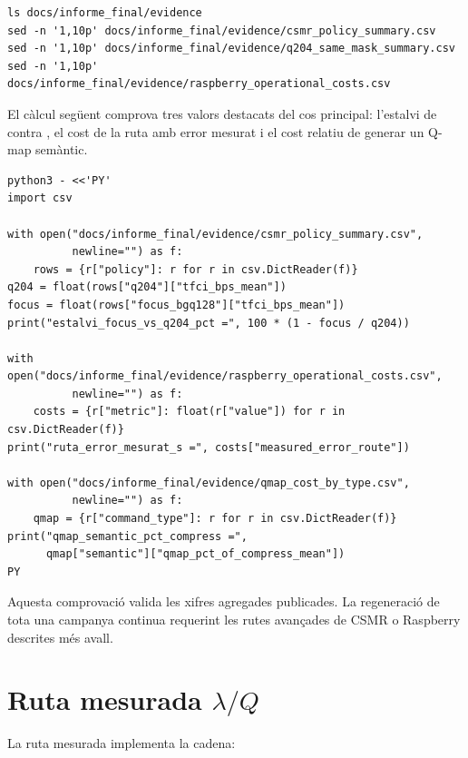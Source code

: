 \begin{verbatim}
ls docs/informe_final/evidence
sed -n '1,10p' docs/informe_final/evidence/csmr_policy_summary.csv
sed -n '1,10p' docs/informe_final/evidence/q204_same_mask_summary.csv
sed -n '1,10p' docs/informe_final/evidence/raspberry_operational_costs.csv
\end{verbatim}

El càlcul següent comprova tres valors destacats del cos principal: l'estalvi de
 contra , el cost de la ruta amb error mesurat i
el cost relatiu de generar un Q-map semàntic.

\begin{verbatim}
python3 - <<'PY'
import csv

with open("docs/informe_final/evidence/csmr_policy_summary.csv",
          newline="") as f:
    rows = {r["policy"]: r for r in csv.DictReader(f)}
q204 = float(rows["q204"]["tfci_bps_mean"])
focus = float(rows["focus_bgq128"]["tfci_bps_mean"])
print("estalvi_focus_vs_q204_pct =", 100 * (1 - focus / q204))

with open("docs/informe_final/evidence/raspberry_operational_costs.csv",
          newline="") as f:
    costs = {r["metric"]: float(r["value"]) for r in csv.DictReader(f)}
print("ruta_error_mesurat_s =", costs["measured_error_route"])

with open("docs/informe_final/evidence/qmap_cost_by_type.csv",
          newline="") as f:
    qmap = {r["command_type"]: r for r in csv.DictReader(f)}
print("qmap_semantic_pct_compress =",
      qmap["semantic"]["qmap_pct_of_compress_mean"])
PY
\end{verbatim}

Aquesta comprovació valida les xifres agregades publicades. La regeneració de
tota una campanya continua requerint les rutes avançades de CSMR o Raspberry
descrites més avall.

\section{Ruta mesurada \texorpdfstring{$\lambda/Q$}{lambda/Q}}

La ruta mesurada implementa la cadena:

\begin{center}
\end{center}

